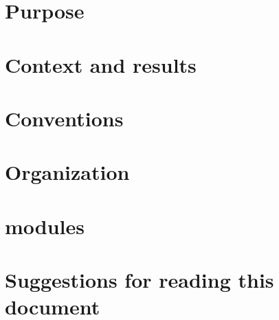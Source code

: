 \section{Purpose}                                                                                     
\section{Context and results}                                                                         
\section{Conventions}                                \label{sec: introduction: conventions}           
\section{Organization}                               \label{sec: introduction: organization}             
\section{\specDeprecated{} modules}                  \label{sec: introduction: deprecated modules}    
\section{Suggestions for reading this document}                                                       
